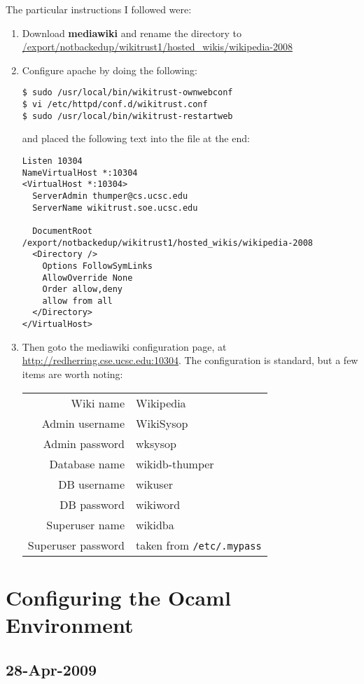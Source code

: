The particular instructions I followed were:
\begin{enumerate}
\item Download \textbf{mediawiki} and rename the directory 
	to \url{/export/notbackedup/wikitrust1/hosted\_wikis/wikipedia-2008}
\item Configure apache by doing the following:
\begin{verbatim}
$ sudo /usr/local/bin/wikitrust-ownwebconf
$ vi /etc/httpd/conf.d/wikitrust.conf
$ sudo /usr/local/bin/wikitrust-restartweb
\end{verbatim}
	and placed the following text into the file at the end:
\begin{verbatim}
Listen 10304
NameVirtualHost *:10304
<VirtualHost *:10304>
  ServerAdmin thumper@cs.ucsc.edu
  ServerName wikitrust.soe.ucsc.edu

  DocumentRoot /export/notbackedup/wikitrust1/hosted_wikis/wikipedia-2008
  <Directory />
    Options FollowSymLinks
    AllowOverride None
    Order allow,deny
    allow from all
  </Directory>
</VirtualHost>
\end{verbatim}

\item Then goto the mediawiki configuration page, at
    \url{http://redherring.cse.ucsc.edu:10304}.
    The configuration is standard, but a few items are worth noting:
\begin{table}[h]
\begin{tabular}{r l}
Wiki name & Wikipedia \\
Admin username & WikiSysop \\
Admin password & wksysop \\
Database name & wikidb-thumper \\
DB username & wikuser \\
DB password & wikiword \\
Superuser name & wikidba \\
Superuser password & taken from \texttt{/etc/.mypass} \\
\end{tabular}
\end{table}


\end{enumerate}

\section{Configuring the Ocaml Environment}

\subsection{28-Apr-2009}

